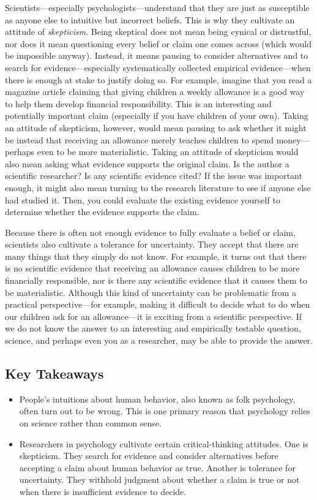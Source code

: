 \documentclass[]{book}
\theoremstyle{definition}
\theoremstyle{definition}
\theoremstyle{remark}
\begin{document}
Scientists---especially psychologists---understand that they are just as
susceptible as anyone else to intuitive but incorrect beliefs. This is
why they cultivate an attitude of \emph{skepticism}. Being skeptical
does not mean being cynical or distrustful, nor does it mean questioning
every belief or claim one comes across (which would be impossible
anyway). Instead, it means pausing to consider alternatives and to
search for evidence---especially systematically collected empirical
evidence---when there is enough at stake to justify doing so. For
example, imagine that you read a magazine article claiming that giving
children a weekly allowance is a good way to help them develop financial
responsibility. This is an interesting and potentially important claim
(especially if you have children of your own). Taking an attitude of
skepticism, however, would mean pausing to ask whether it might be
instead that receiving an allowance merely teaches children to spend
money---perhaps even to be more materialistic. Taking an attitude of
skepticism would also mean asking what evidence supports the original
claim. Is the author a scientific researcher? Is any scientific evidence
cited? If the issue was important enough, it might also mean turning to
the research literature to see if anyone else had studied it. Then, you
could evaluate the existing evidence yourself to determine whether the
evidence supports the claim.

Because there is often not enough evidence to fully evaluate a belief or
claim, scientists also cultivate a tolerance for uncertainty. They
accept that there are many things that they simply do not know. For
example, it turns out that there is no scientific evidence that
receiving an allowance causes children to be more financially
responsible, nor is there any scientific evidence that it causes them to
be materialistic. Although this kind of uncertainty can be problematic
from a practical perspective---for example, making it difficult to
decide what to do when our children ask for an allowance---it is
exciting from a scientific perspective. If we do not know the answer to
an interesting and empirically testable question, science, and perhaps
even you as a researcher, may be able to provide the answer.

\subsection{Key Takeaways}\label{key-takeaways-2}

\begin{itemize}
\item
  People's intuitions about human behavior, also known as folk
  psychology, often turn out to be wrong. This is one primary reason
  that psychology relies on science rather than common sense.
\item
  Researchers in psychology cultivate certain critical-thinking
  attitudes. One is skepticism. They search for evidence and consider
  alternatives before accepting a claim about human behavior as true.
  Another is tolerance for uncertainty. They withhold judgment about
  whether a claim is true or not when there is insufficient evidence to
  decide.
\end{itemize}
\end{document}
